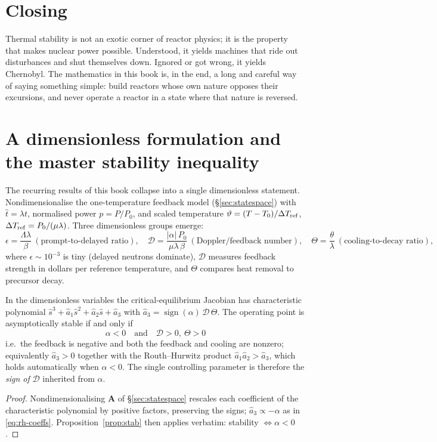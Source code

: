 \section{Closing}

Thermal stability is not an exotic corner of reactor physics; it is the property
that makes nuclear power possible. Understood, it yields machines that ride out
disturbances and shut themselves down. Ignored or got wrong, it yields Chernobyl.
The mathematics in this book is, in the end, a long and careful way of saying
something simple: build reactors whose own nature opposes their excursions, and
never operate a reactor in a state where that nature is reversed.



\section{A dimensionless formulation and the master stability inequality}
\label{sec:dimensionless}

The recurring results of this book collapse into a single dimensionless statement.
Nondimensionalise the one-temperature feedback model (\S\ref{sec:statespace}) with
$\hat t=\lambda t$, normalised power $p=P/P_0$, and scaled temperature
$\vartheta=(T-T_0)/\Delta T_{\rm ref}$, $\Delta T_{\rm ref}=P_0/(\mu\lambda)$.
Three dimensionless groups emerge:
\begin{equation}
\epsilon=\frac{\Lambda\lambda}{\beta}\ (\text{prompt-to-delayed ratio}),\quad
\mathcal D=\frac{|\alpha|\,P_0}{\mu\lambda\,\beta}\ (\text{Doppler/feedback number}),\quad
\Theta=\frac{\theta}{\lambda}\ (\text{cooling-to-decay ratio}),
\end{equation}
where $\epsilon\sim10^{-3}$ is tiny (delayed neutrons dominate),
$\mathcal D$ measures feedback strength in dollars per reference temperature, and
$\Theta$ compares heat removal to precursor decay.

\begin{theorem}
\label{thm:master}
In the dimensionless variables the critical-equilibrium Jacobian has characteristic
polynomial $\hat s^3+\hat a_1\hat s^2+\hat a_2\hat s+\hat a_3$ with
$\hat a_3=\operatorname{sign}(\alpha)\,\mathcal D\,\Theta$. The operating point is
asymptotically stable if and only if
\begin{equation}
\boxed{\ \alpha<0\quad\text{and}\quad \mathcal D>0,\ \Theta>0\ }
\end{equation}
i.e.\ the feedback is negative and both the feedback and cooling are nonzero;
equivalently $\hat a_3>0$ together with the Routh--Hurwitz product
$\hat a_1\hat a_2>\hat a_3$, which holds automatically when $\alpha<0$. The single
controlling parameter is therefore the \emph{sign of} $\mathcal D$ inherited from
$\alpha$.
\end{theorem}
\begin{proof}
Nondimensionalising $\mathbf A$ of \S\ref{sec:statespace} rescales each coefficient
of the characteristic polynomial by positive factors, preserving the signs;
$\hat a_3\propto-\alpha$ as in \eqref{eq:rh-coeffs}. Proposition~\ref{prop:stab}
then applies verbatim: stability $\iff\alpha<0$.
\end{proof}

